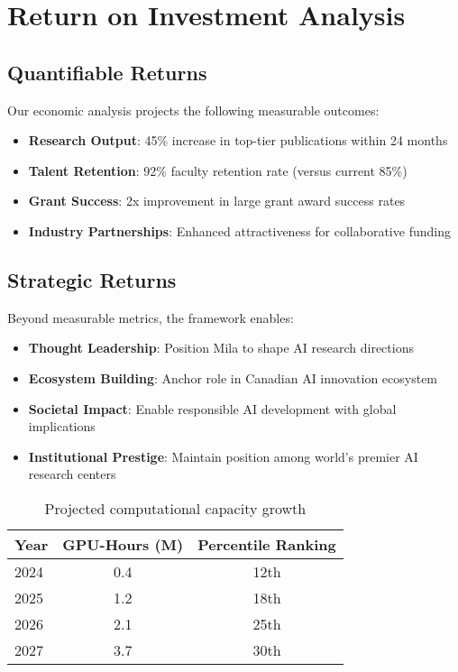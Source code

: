 \documentclass{article}
\begin{document}
\section{Return on Investment Analysis}

\subsection{Quantifiable Returns}

Our economic analysis projects the following measurable outcomes:

\begin{itemize}
\item \textbf{Research Output}: 45\% increase in top-tier publications within 24 months
\item \textbf{Talent Retention}: 92\% faculty retention rate (versus current 85\%)
\item \textbf{Grant Success}: 2x improvement in large grant award success rates
\item \textbf{Industry Partnerships}: Enhanced attractiveness for collaborative funding
\end{itemize}

\subsection{Strategic Returns}

Beyond measurable metrics, the framework enables:

\begin{itemize}
\item \textbf{Thought Leadership}: Position Mila to shape AI research directions
\item \textbf{Ecosystem Building}: Anchor role in Canadian AI innovation ecosystem
\item \textbf{Societal Impact}: Enable responsible AI development with global implications
\item \textbf{Institutional Prestige}: Maintain position among world's premier AI research centers
\end{itemize}

\begin{table}
  \caption{Projected computational capacity growth}
  \label{capacity-table}
  \centering
  \begin{tabular}{lcc}
    \toprule
    Year & GPU-Hours (M) & Percentile Ranking \\
    \midrule
    2024 & 0.4 & 12th \\
    2025 & 1.2 & 18th \\
    2026 & 2.1 & 25th \\
    2027 & 3.7 & 30th \\
    \bottomrule
  \end{tabular}
\end{table}
\end{document}
